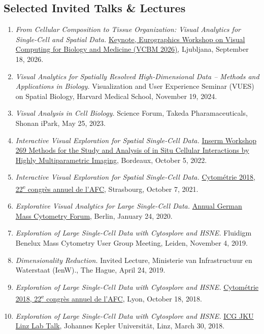 \documentclass[10pt,a4paper,roman,final]{moderncv}
\begin{document}
\subsection*{Selected Invited Talks \& Lectures}
\begin{enumerate}[leftmargin=0cm]
\item
\emph{From Cellular Composition to Tissue Organization: Visual Analytics for Single-Cell and Spatial Data.} \href{https://conferences.eg.org/vcbm2026/keynotes/}{Keynote, Eurographics Workshop on Visual Computing for Biology and Medicine (VCBM 2026)}, Ljubljana, September 18, 2026.
\item
\emph{Visual Analytics for Spatially Resolved High-Dimensional Data – Methods and Applications in Biology.} Visualization and User Experience Seminar (VUES) on Spatial Biology, Harvard Medical School, November 19, 2024.
\item
\emph{Visual Analysis in Cell Biology.} Science Forum, Takeda Pharamaceuticals, Shonan iPark, May 25, 2023.
\item
\emph{Interactive Visual Exploration for Spatial Single-Cell Data.} \href{https://afcytometrie.fr/wp-content/uploads/2022/07/Affiche-269.pdf}{Inserm Workshop 269 Methods for the Study and Analysis of in Situ Cellular Interactions by Highly Multiparametric Imaging}, Bordeaux, October 5, 2022.
\item
\emph{Interactive Visual Exploration for Spatial Single-Cell Data.} \href{https://www.alphavisa.com/afc/2021/}{Cytométrie 2018, 22\textsuperscript{e} congrès annuel de l’AFC}, Strasbourg, October 7, 2021.
\item
\emph{Explorative Visual Analytics for Large Single-Cell Data.} \href{https://masscytometry.de/user-forum/3rd-german-mass-cytometry-user-forum}{Annual German Mass Cytometry Forum}, Berlin, January 24, 2020.
\item
\emph{Exploration of Large Single-Cell Data with Cytosplore and HSNE.} Fluidigm Benelux Mass Cytometry User Group Meeting, Leiden, November 4, 2019.
\item
\emph{Dimensionality Reduction.} Invited Lecture, Ministerie van Infrastructuur en Waterstaat (IenW)., The Hague, April 24, 2019.
\item
\emph{Exploration of Large Single-Cell Data with Cytosplore and HSNE.} \href{https://www.alphavisa.com/afc/2018/}{Cytométrie 2018, 22\textsuperscript{e} congrès annuel de l’AFC}, Lyon, October 18, 2018.
\item
\emph{Exploration of Large Single-Cell Data with Cytosplore and HSNE.} \href{https://www.youtube.com/watch?v=dQnj3PejG6w}{ICG JKU Linz Lab Talk}, Johannes Kepler Universität, Linz, March 30, 2018.

\end{enumerate}
\end{document}
